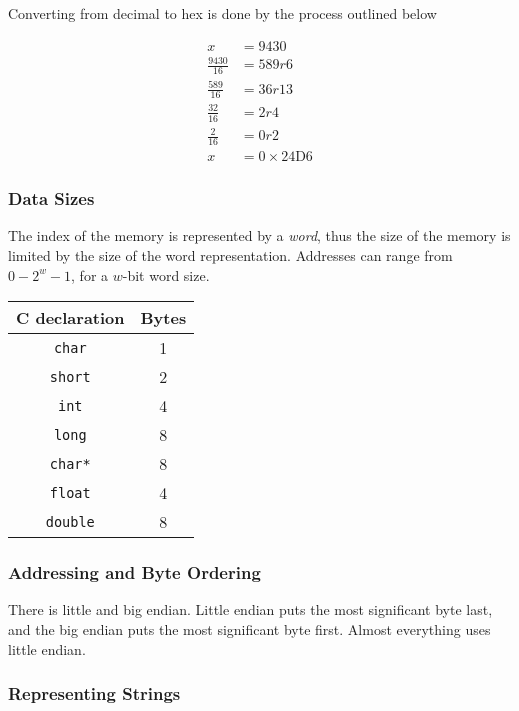 \documentclass[10pt]{armath}
\newcommand{\s}[1]{\texttt{#1}}
\begin{document}
Converting from decimal to hex is done by the process outlined below

\begin{align*}
  x&=9430\\
  \frac{9430}{16}&=589 r6\\
  \frac{589}{16}&=36 r13\\
  \frac{32}{16}&=2 r4\\
  \frac{2}{16}&=0 r2\\
  x&=0\times 24\text{D}6
\end{align*}

\subsubsection{Data Sizes}%
\label{ssub:data_sizes}

The index of the memory is represented by a \textit{word}, thus the size of the
memory is limited by the size of the word representation. Addresses can range
from $0-2^w-1$, for a $w$-bit word size.

\begin{center}
  \begin{tabular}{c c}
    C declaration & Bytes \\
    \hline
    \s{char} & 1\\
    \s{short} & 2 \\
    \s{int} & 4 \\
    \s{long} & 8 \\
    \s{char*} & 8 \\
    \s{float} & 4 \\
    \s{double} & 8\\
    \hline
  \end{tabular}
\end{center}

\subsubsection{Addressing and Byte Ordering}%
\label{ssub:addressing_and_byte_ordering}

There is little and big endian. Little endian puts the most significant byte
last, and the big endian puts the most significant byte first. Almost
everything uses little endian.

\subsubsection{Representing Strings}%
\label{ssub:representing_strings}
\end{document}

